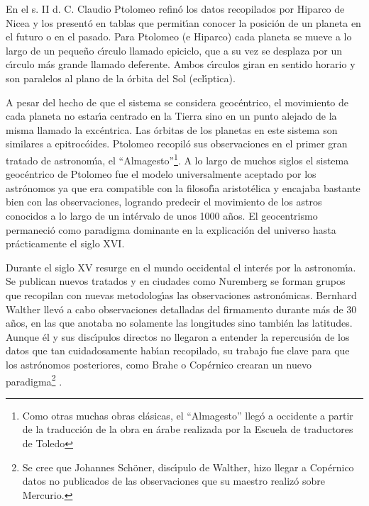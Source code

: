 En el s. II d. C. Claudio Ptolomeo refin\'o los datos recopilados por Hiparco de Nicea y los present\'o  en tablas que permit\'\i{}an conocer la posici\'on de un planeta en el futuro o en el pasado. Para Ptolomeo (e Hiparco) cada planeta se mueve a lo largo de un peque\~{n}o c\'\i{}rculo llamado epiciclo, que a su vez se desplaza por un c\'\i{}rculo m\'as grande llamado deferente. Ambos c\'\i{}rculos giran en sentido horario y son paralelos al plano de la \'orbita del Sol (ecl\'\i{}ptica).


A pesar del hecho de que el sistema se considera geoc\'entrico, el movimiento de cada planeta no estar\'\i{}a centrado en la Tierra sino en un punto alejado de la misma llamado la exc\'entrica. Las \'orbitas de los planetas en este sistema son similares a epitroc\'oides. Ptolomeo recopil\'o sus observaciones en el primer gran tratado de astronom\'\i{}a, el ``Almagesto''\footnote{Como otras muchas obras cl\'asicas, el ``Almagesto''  lleg\'o a occidente a partir de la traducci\'on de la obra en \'arabe realizada por la Escuela de traductores de Toledo}. A lo largo de muchos siglos el sistema geoc\'entrico de Ptolomeo fue el modelo universalmente aceptado por los astr\'onomos ya que era compatible con la filosof\'\i{}a aristot\'elica y encajaba bastante bien con las observaciones, logrando predecir el movimiento de los astros conocidos a lo largo de un int\'ervalo de unos 1000 a\~{n}os. El geocentrismo permaneci\'o como paradigma dominante en la explicaci\'on del universo hasta pr\'acticamente el siglo XVI. 

%
%
%
Durante el siglo XV resurge en el mundo occidental el inter\'es por la astronom\'\i{}a. Se publican nuevos tratados y en ciudades como Nuremberg se forman grupos que recopilan con nuevas metodolog\'\i{}as las observaciones astron\'omicas.  Bernhard Walther  llev\'o a cabo observaciones detalladas del firmamento durante m\'as de 30 a\~{n}os, en las que anotaba no solamente las longitudes sino tambi\'en las latitudes. Aunque \'el y sus disc\'\i{}pulos directos no llegaron a entender la repercusi\'on de los datos que tan cuidadosamente hab\'\i{}an recopilado, su trabajo fue clave para que los astr\'onomos posteriores, como Brahe o Cop\'ernico crearan un nuevo paradigma\footnote{Se cree que Johannes Sch\"{o}ner, disc\'\i{}pulo de Walther, hizo llegar a Cop\'ernico datos no publicados de las observaciones que su maestro realiz\'o sobre Mercurio.} . 

